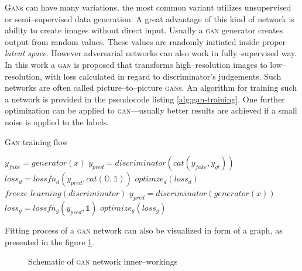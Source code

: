 \textsc{Gan}s can have many variations, the most common variant utilizes unsupervised or semi--supervised data generation.
A great advantage of this kind of network is ability to create images without direct input.
Usually a \textsc{gan} generator creates output from random values.
These values are randomly initiated inside proper \textit{latent space}.
However adversarial networks can also work in fully--supervised way.
In this work a \textsc{gan} is proposed that transforms high--resolution images to low--resolution, with loss calculated in regard to discriminator's judgements.
Such networks are often called picture--to--picture \textsc{gan}s.
An algorithm for training such a network is provided in the pseudocode listing \ref{alg:gan-training}.
One further optimization can be applied to \textsc{gan}---usually better results are achieved if a small noise is applied to the labels.
\begin{algorithm}
\caption{\textsc{Gan} training flow}
\label{alg:gan-training}
\begin{algorithmic}
	\STATE $ y_{fake} = generator(x) $
	\STATE $ y_{pred} = discriminator(cat(y_{fake}, y_{gt})) $
	\STATE $ loss_d = lossfn_d(y_{pred}, cat(\mathds{O}, \mathds{1})) $
	\STATE $ optimze_d(loss_d) $
	\STATE $ freeze\_learning(discriminator) $
	\STATE $ y_{pred} = discriminator(generator(x)) $
	\STATE $ loss_g = lossfn_g(y_{pred}, \mathds{1}) $
	\STATE $ optimize_g(loss_g) $
\end{algorithmic}
\end{algorithm}
Fitting process of a \textsc{gan} network can also be visualized in form of a graph, as presented in the figure \ref{fig:gan-training}.
\begin{figure}
    \centering
    
    \caption{Schematic of \textsc{gan} network inner--workings}
    \label{fig:gan-training}
\end{figure}

